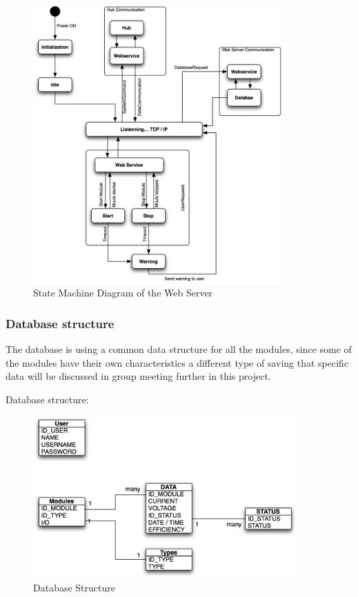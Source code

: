 	\begin{figure}[H]
		\begin{centering}
			 \includegraphics[width=0.85\textwidth]{images/state_web.png}
		\caption{State Machine Diagram of the Web Server}
	 	\end{centering}
	\end{figure}
	
\subsubsection{Database structure}

The database is using a common data structure for all the modules, since some of the modules have their own characteristics a different type of saving that specific data will be discussed in group meeting further in this project. 
	
	Database structure:\p
	\begin{figure}[H]
		\begin{centering}
			 \includegraphics[width=0.9\textwidth]{images/db_prop.png}
		\caption{Database Structure}
	 	\end{centering}
	\end{figure}

